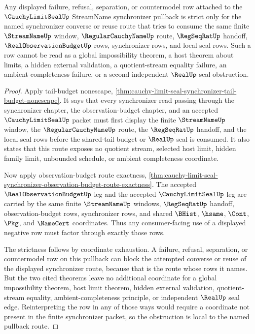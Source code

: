 \begin{corollary}
\label{cor:cauchy-limit-seal-synchronizer-strict-local-obstruction}
Any displayed failure, refusal, separation, or countermodel row attached to the $\CauchyLimitSealUp$ StreamName synchronizer pullback is strict only for the named synchronizer converse or reuse route that tries to consume the same finite $\StreamNameUp$ window, $\RegularCauchyNameUp$ route, $\RegSeqRatUp$ handoff, $\RealObservationBudgetUp$ rows, synchronizer rows, and local seal rows. Such a row cannot be read as a global impossibility theorem, a host theorem about limits, a hidden external validation, a quotient-stream equality failure, an ambient-completeness failure, or a second independent $\RealUp$ seal obstruction.
\end{corollary}
\begin{proof}
Apply tail-budget nonescape, \autoref{thm:cauchy-limit-seal-synchronizer-tail-budget-nonescape}. It says that every synchronizer read passing through the synchronizer chapter, the observation-budget chapter, and an accepted $\CauchyLimitSealUp$ packet must first display the finite $\StreamNameUp$ window, the $\RegularCauchyNameUp$ route, the $\RegSeqRatUp$ handoff, and the local seal rows before the shared-tail budget or $\RealUp$ seal is consumed. It also states that this route exposes no quotient stream, selected host limit, hidden family limit, unbounded schedule, or ambient completeness coordinate.

Now apply observation-budget route exactness, \autoref{thm:cauchy-limit-seal-synchronizer-observation-budget-route-exactness}. The accepted $\RealObservationBudgetUp$ leg and the accepted $\CauchyLimitSealUp$ leg are carried by the same finite $\StreamNameUp$ windows, $\RegSeqRatUp$ handoff, observation-budget rows, synchronizer rows, and shared $\BHist$, $\hsame$, $\Cont$, $\Pkg$, and $\NameCert$ coordinates. Thus any consumer-facing use of a displayed negative row must factor through exactly those rows.

The strictness follows by coordinate exhaustion. A failure, refusal, separation, or countermodel row on this pullback can block the attempted converse or reuse of the displayed synchronizer route, because that is the route whose rows it names. But the two cited theorems leave no additional coordinate for a global impossibility theorem, host limit theorem, hidden external validation, quotient-stream equality, ambient-completeness principle, or independent $\RealUp$ seal edge. Reinterpreting the row in any of those ways would require a coordinate not present in the finite synchronizer packet, so the obstruction is local to the named pullback route.
\end{proof}
